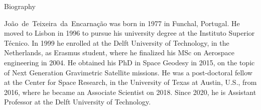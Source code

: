 
\begin{cvtext}{Biography}

Jo\~ao~de~Teixeira~da~Encarna\c c\~ao was born in 1977 in Funchal, Portugal.
He moved to Lisbon in 1996 to pursue his university degree at the Instituto Superior Técnico.
In 1999 he enrolled at the Delft University of Technology, in the Netherlands, as Erasmus student, where he finalized his MSc on Aerospace engineering in 2004.
He obtained his PhD in Space Geodesy in 2015, on the topic of Next Generation Gravimetric Satellite missions.
He was a post-doctoral fellow at the Center for Space Research, in the University of Texas at Austin, U.S., from 2016, where he became an Associate Scientist on 2018.
Since 2020, he is Assistant Professor at the Delft University of Technology.

\end{cvtext}
